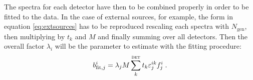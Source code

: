 The spectra for each detector have then to be combined properly in order to be fitted to the data. In the case of external sources, for example, the form in equation \ref{eq:extsources} has to be reproduced rescaling each spectra with $N_\text{gen}$, then multiplying by $t_k$ and $M$ and finally summing over all detectors. Then the overall factor $\lambda_i$ will be the parameter to estimate with the fitting procedure:
\[b_{\text{fit},j}^i=\lambda_jM\sum_k^\textsc{det}t_k\epsilon_j^{ik}f_j^i\;.\]

